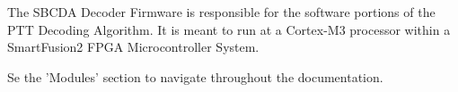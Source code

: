 
\begin{DoxyPre}
The SBCDA Decoder Firmware is responsible for the software portions
of the PTT Decoding Algorithm. It is meant to run at a Cortex-M3
processor within a SmartFusion2 FPGA Microcontroller System.\end{DoxyPre}



\begin{DoxyPre}Se the 'Modules' section to navigate throughout the documentation.
\end{DoxyPre}
 